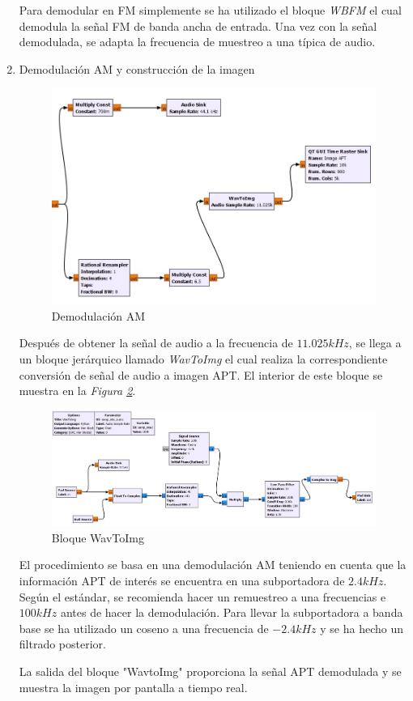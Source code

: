\documentclass[a4paper,openright,12pt]{article}
\begin{document}
\begin{enumerate}
 Para demodular en FM simplemente se ha utilizado el bloque \textit{WBFM} el cual demodula la señal FM de banda ancha de entrada. Una vez con la señal demodulada, se adapta la frecuencia de muestreo a una típica de audio.	
	
	\item Demodulación AM y construcción de la imagen
	
		\begin{figure}[hbtp]
 \centering
 \includegraphics[width = 12cm]{imagenes/apt_blocks.JPG}
 \caption{Demodulación AM}
 \label{apt_blocks}
 \end{figure}
	
	
Después de obtener la señal de audio a la frecuencia de $11.025 kHz$, se llega a un bloque jerárquico llamado \textit{WavToImg} el cual realiza la correspondiente conversión de señal de audio a imagen APT. El interior de este bloque se muestra en la \textit{Figura \ref{wavtoimage}}.

 \begin{figure}[hbtp]
 \centering
 \includegraphics[width = 17cm]{imagenes/APT_hier.JPG}
 \caption{Bloque WavToImg}
 \label{wavtoimage}
 \end{figure}	
 
 El procedimiento se basa en una demodulación AM teniendo en cuenta que la información APT de interés se encuentra en una subportadora de $2.4 kHz$. 
	Según el estándar, se recomienda hacer un remuestreo a una frecuencias e $100 kHz$ antes de hacer la demodulación. Para llevar la subportadora a banda base se ha utilizado un coseno a una frecuencia de $-2.4 kHz$ y se ha hecho un filtrado posterior.
	
La salida del bloque "WavtoImg" proporciona la señal APT demodulada y se muestra la imagen por pantalla a tiempo real.
	
	
	\end{enumerate}
	
\end{document}
